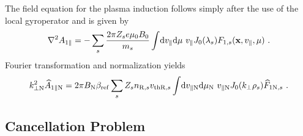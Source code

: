 The field equation for the plasma induction follows simply after the use of the local gyroperator and is given by
\begin{gather}
	\nabla^2 A_{1\parallel} = - \sum_s \frac{2\pi Z_se \mu_0 B_0}{m_s}  \int \! \mathrm{d}v_\parallel\mathrm{d}\mu ~ v_\parallel J_0(\lambda_s) F_{1,s}(\boldsymbol{\mathbf{x}}, v_\parallel, \mu)~.
	\label{eq:fieldInductionLocal}
\end{gather}
Fourier transformation and normalization yields
\begin{gather}
	k_{\perp \mathrm{N}}^2 \widehat{A}_{1\parallel \mathrm{N}} = 2 \pi B_\mathrm{N} \beta_\mathrm{ref}\sum_s Z_s n_{\mathrm{R},s} v_{\mathrm{th}\mathrm{R},s} \int \! \mathrm{d}v_{\parallel \mathrm{N}}\mathrm{d}\mu_\mathrm{N} ~ v_{\parallel \mathrm{N}} J_0(k_\perp \rho_s) \widehat{F}_{1\mathrm{N},s}~.
	\label{eq:fieldInductionLocalNorm}
\end{gather}
\newpage

\subsection{Cancellation Problem}
\label{sub:cancelProblem}

